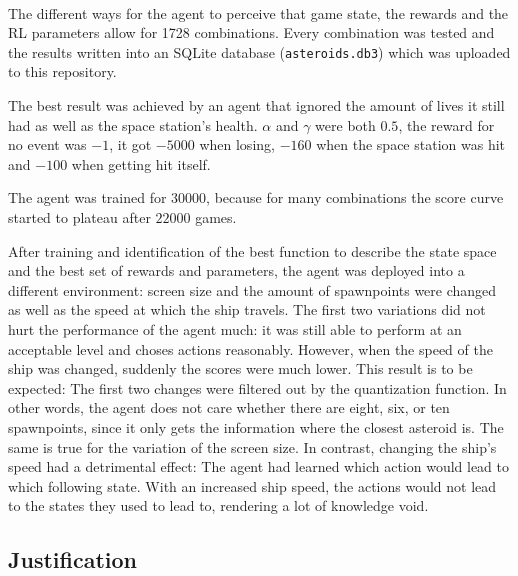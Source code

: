 \documentclass[a4paper,10pt]{article}
\begin{document}
\paragraph{}
The different ways for the agent to perceive that game state, the rewards and the RL parameters allow for 1728 combinations.
Every combination was tested and the results written into an SQLite database (\texttt{asteroids.db3}) which was uploaded to this repository.

The best result was achieved by an agent that ignored the amount of lives it still had as well as the space station's health.
$\alpha$ and $\gamma$ were both $0.5$, the reward for no event was $-1$, it got $-5000$ when losing, $-160$ when the space station was hit and $-100$ when getting hit itself.

The agent was trained for $30000$, because for many combinations the score curve started to plateau after $22000$ games.

After training and identification of the best function to describe the state space and the best set of rewards and parameters, the agent was deployed into a different environment:
screen size and the amount of spawnpoints were changed as well as the speed at which the ship travels.
The first two variations did not hurt the performance of the agent much: it was still able to perform at an acceptable level and choses actions reasonably.
However, when the speed of the ship was changed, suddenly the scores were much lower.
This result is to be expected: The first two changes were filtered out by the quantization function.
In other words, the agent does not care whether there are eight, six, or ten spawnpoints, since it only gets the information where the closest asteroid is.
The same is true for the variation of the screen size.
In contrast, changing the ship's speed had a detrimental effect: 
The agent had learned which action would lead to which following state.
With an increased ship speed, the actions would not lead to the states they used to lead to, rendering a lot of knowledge void.

\subsection{Justification}
\end{document}
